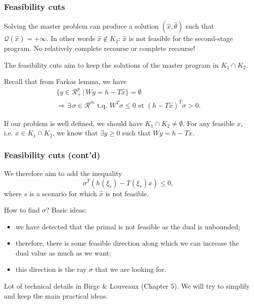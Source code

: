 \documentclass{beamer}
\def\rit{\mathcal{R}}
\begin{document}
\begin{frame}
\frametitle{Feasibility cuts}

Solving the master problem can produce a solution $(\hat{x}, \hat{\theta})$ such that $\mathcal{Q}(\hat{x}) = +\infty$.
In other words $\hat{x} \notin K_2$: $\hat{x}$ is not feasible for the second-stage program.
No relatively complete recourse or complete recourse!
	
\mbox{}
	
The {\blue feasibility cuts} aim to keep the solutions of the master program in $K_1 \cap K_2$.
	
\mbox{}
	
\mbox{}

Recall that from Farkas lemma, we have
\begin{multline*}
\lbrace y \in \rit^p_+ \,|\, Wy = h-T\hat{x} \rbrace = \emptyset \\
\Rightarrow \exists\, \sigma \in \rit^m \mbox{ t.q. } W^T\sigma \leq 0
\mbox{ et } (h-T\hat{x})^T\sigma > 0.
\end{multline*}

\mbox{}

If our problem is well defined, we should have $K_1 \cap K_2 \ne \emptyset$.
For any feasible $x$, i.e. $x \in K_1 \cap K_2$, we know that $\exists y \geq 0$ such that $Wy = h-Tx$.
	
\end{frame}

\begin{frame}
\frametitle{Feasibility cuts (cont'd)}

We therefore aim to add the inequality
\[
\sigma^T(h(\xi_s)-T(\xi_s)x) \leq 0,
\]
where $s$ is a scenario for which $\hat{x}$ is not feasible.
	
\mbox{}
	
How to find $\sigma$? Basic ideas:
\begin{itemize}
\item
we have detected that the primal is not feasible as the dual is unbounded;
\item
therefore, there is some feasible direction along which we can increase the dual value as much as we want;
\item
this direction is the ray $\sigma$ that we are looking for.
\end{itemize}

\mbox{}

Lot of technical details in Birge \& Louveaux (Chapter 5). We will try to simplify and keep the main practical ideas.
	
\end{frame}
\end{document}
